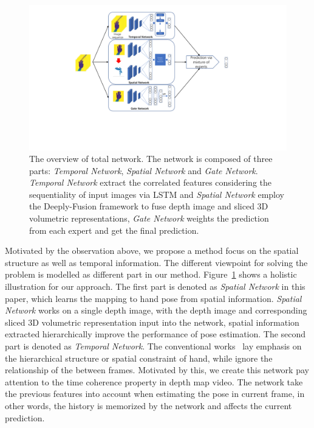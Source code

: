 \documentclass[journal,comsoc]{IEEEtran}
\let\MYoriglatexcaption\caption
\renewcommand{\caption}[2][\relax]{\MYoriglatexcaption[#2]{#2}}
\begin{document}
\begin{figure}[t]
    \centering
    \includegraphics[width=1\linewidth]{src/network/architecture.pdf}
    \caption{The overview of total network. The network is composed of three parts: \emph{Temporal Network}, 
    \emph{Spatial Network} and \emph{Gate Network}. \emph{Temporal Network} extract the correlated features 
    considering the sequentiality of input images via LSTM and \emph{Spatial Network} employ the Deeply-Fusion 
    framework to fuse depth image and sliced 3D volumetric representations, \emph{Gate Network} weights the 
    prediction from each expert and get the final prediction.}
\label{fig:architecture}
\end{figure}

Motivated by the observation above, we propose a method focus on the spatial structure as well as
temporal information. The different viewpoint for solving the problem is modelled as different part in
our method. Figure~\ref{fig:architecture} shows a holistic illustration for our approach. The first
part is denoted as \emph{Spatial Network} in this paper, which learns the mapping to hand pose from
spatial information. \emph{Spatial Network} works on a single depth image, with the depth image and
corresponding sliced 3D volumetric representation input into the network, spatial information extracted
hierarchically improve the performance of pose estimation. The second part is denoted as \emph{Temporal Network}.
The conventional works~\cite{tang2014latent, zhou2016model, tang2015opening} lay emphasis on the
hierarchical structure or spatial constraint of hand, while ignore the relationship
of the between frames. Motivated by this, we create this network pay attention to the time coherence property
in depth map video. The network take the previous features into account when estimating the pose in current frame,
in other words, the history is memorized by the network and affects the current prediction.
\end{document}
